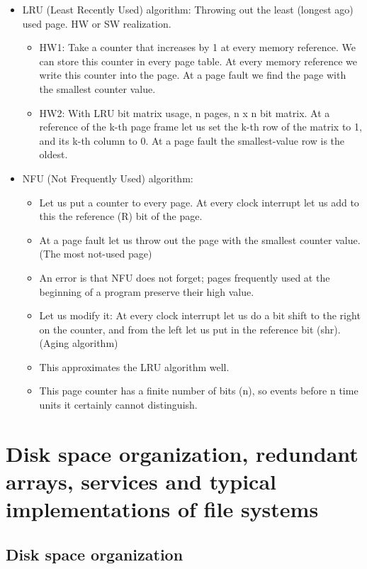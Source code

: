 \documentclass[margin=0px]{article}
\begin{document}
\begin{itemize}
    \item LRU (Least Recently Used) algorithm: Throwing out the least (longest ago) used page. HW or SW realization.
          \begin{itemize}
              \item HW1: Take a counter that increases by 1 at every memory reference. We can store this counter in every page table. At every memory reference we write this counter into the page. At a page fault we find the page with the smallest counter value.
              \item HW2: With LRU bit matrix usage, n pages, n x n bit matrix. At a reference of the k-th page frame let us set the k-th row of the matrix to 1, and its k-th column to 0. At a page fault the smallest-value row is the oldest.
          \end{itemize}
    \item NFU (Not Frequently Used) algorithm:
          \begin{itemize}
              \item Let us put a counter to every page. At every clock interrupt let us add to this the reference (R) bit of the page.
              \item At a page fault let us throw out the page with the smallest counter value. (The most not-used page)
              \item An error is that NFU does not forget; pages frequently used at the beginning of a program preserve their high value.
              \item Let us modify it: At every clock interrupt let us do a bit shift to the right on the counter, and from the left let us put in the reference bit (shr). (Aging algorithm)
              \item This approximates the LRU algorithm well.
              \item This page counter has a finite number of bits (n), so events before n time units it certainly cannot distinguish.
          \end{itemize}
\end{itemize}

\section{Disk space organization, redundant arrays, services and typical implementations of file systems}

\subsection{Disk space organization}
\end{document}

